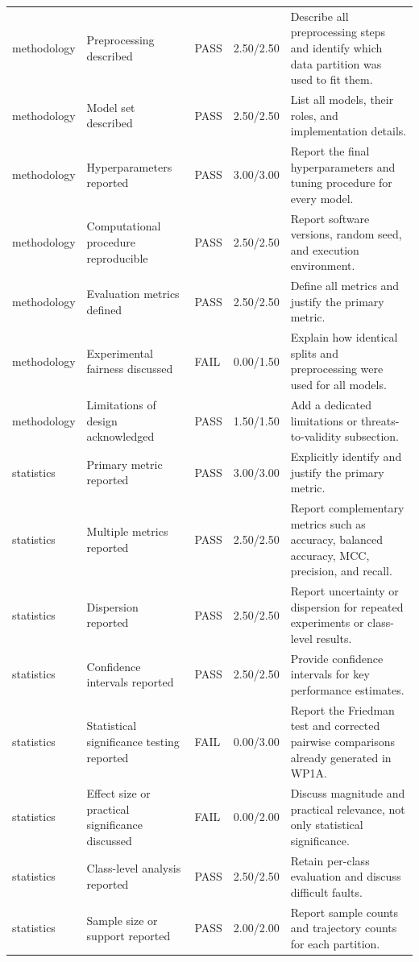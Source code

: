 \begin{longtable}{p{2.6cm}p{5.2cm}p{1.5cm}p{1.4cm}p{4.8cm}}
methodology & Preprocessing described & PASS & 2.50/2.50 & Describe all preprocessing steps and identify which data partition was used to fit them. \\
methodology & Model set described & PASS & 2.50/2.50 & List all models, their roles, and implementation details. \\
methodology & Hyperparameters reported & PASS & 3.00/3.00 & Report the final hyperparameters and tuning procedure for every model. \\
methodology & Computational procedure reproducible & PASS & 2.50/2.50 & Report software versions, random seed, and execution environment. \\
methodology & Evaluation metrics defined & PASS & 2.50/2.50 & Define all metrics and justify the primary metric. \\
methodology & Experimental fairness discussed & FAIL & 0.00/1.50 & Explain how identical splits and preprocessing were used for all models. \\
methodology & Limitations of design acknowledged & PASS & 1.50/1.50 & Add a dedicated limitations or threats-to-validity subsection. \\
statistics & Primary metric reported & PASS & 3.00/3.00 & Explicitly identify and justify the primary metric. \\
statistics & Multiple metrics reported & PASS & 2.50/2.50 & Report complementary metrics such as accuracy, balanced accuracy, MCC, precision, and recall. \\
statistics & Dispersion reported & PASS & 2.50/2.50 & Report uncertainty or dispersion for repeated experiments or class-level results. \\
statistics & Confidence intervals reported & PASS & 2.50/2.50 & Provide confidence intervals for key performance estimates. \\
statistics & Statistical significance testing reported & FAIL & 0.00/3.00 & Report the Friedman test and corrected pairwise comparisons already generated in WP1A. \\
statistics & Effect size or practical significance discussed & FAIL & 0.00/2.00 & Discuss magnitude and practical relevance, not only statistical significance. \\
statistics & Class-level analysis reported & PASS & 2.50/2.50 & Retain per-class evaluation and discuss difficult faults. \\
statistics & Sample size or support reported & PASS & 2.00/2.00 & Report sample counts and trajectory counts for each partition. \\

\end{longtable}
